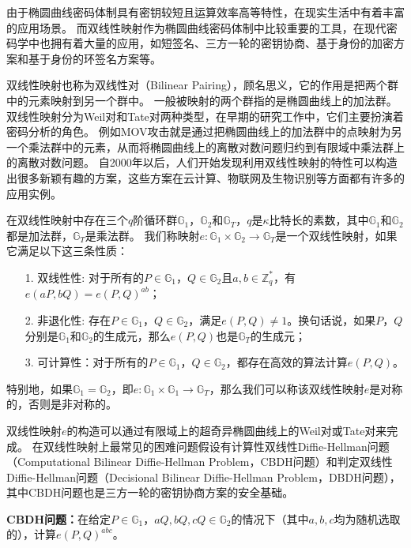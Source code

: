 由于椭圆曲线密码体制具有密钥较短且运算效率高等特性，在现实生活中有着丰富的应用场景。
而双线性映射作为椭圆曲线密码体制中比较重要的工具，在现代密码学中也拥有着大量的应用，如短签名、三方一轮的密钥协商、基于身份的加密方案和基于身份的环签名方案等\cite{boneh2001short,joux2000one,boneh2001identity,chow2005efficient}。

双线性映射也称为双线性对（Bilinear Pairing），顾名思义，它的作用是把两个群中的元素映射到另一个群中\cite{张方国2016从双线性对到多线性映射}。
一般被映射的两个群指的是椭圆曲线上的加法群。
双线性映射分为Weil对和Tate对两种类型，在早期的研究工作中，它们主要扮演着密码分析的角色。
例如MOV攻击就是通过把椭圆曲线上的加法群中的点映射为另一个乘法群中的元素，从而将椭圆曲线上的离散对数问题归约到有限域中乘法群上的离散对数问题。
自2000年以后，人们开始发现利用双线性映射的特性可以构造出很多新颖有趣的方案，这些方案在云计算、物联网及生物识别等方面都有许多的应用实例\cite{张方国2016从双线性对到多线性映射}。

在双线性映射中存在三个$q$阶循环群$\mathbb{G}_1$，$\mathbb{G}_2$和$\mathbb{G}_T$，$q$是$\kappa$比特长的素数，其中$\mathbb{G}_1$和$\mathbb{G}_2$都是加法群，$\mathbb{G}_T$是乘法群。
我们称映射$e:\mathbb{G}_1\times\mathbb{G}_2\rightarrow \mathbb{G}_T$是一个双线性映射，如果它满足以下这三条性质：
\begin{itemize}
  \item[1.] 双线性性: 对于所有的$P\in \mathbb{G}_1$，$Q\in \mathbb{G}_2$且$a,b\in\mathbb{Z}_q^*$，有$e(aP,bQ)=e(P,Q)^{ab}$；
  \item[2.] 非退化性: 存在$P\in \mathbb{G}_1$，$Q\in \mathbb{G}_2$，满足$e(P,Q)\neq1$。换句话说，如果$P$，$Q$分别是$\mathbb{G}_1$和$\mathbb{G}_2$的生成元，那么$e(P,Q)$也是$\mathbb{G}_T$的生成元；
  \item[3.] 可计算性：对于所有的$P\in\mathbb{G}_1$，$Q\in\mathbb{G}_2$，都存在高效的算法计算$e(P,Q)$。  
\end{itemize}
特别地，如果$\mathbb{G}_1=\mathbb{G}_2$，即$e:\mathbb{G}_1\times \mathbb{G}_1\rightarrow \mathbb{G}_T$，那么我们可以称该双线性映射$e$是对称的，否则是非对称的。

双线性映射$e$的构造可以通过有限域上的超奇异椭圆曲线上的Weil对或Tate对来完成。
在双线性映射上最常见的困难问题假设有计算性双线性Diffie-Hellman问题（Computational Bilinear Diffie-Hellman Problem，CBDH问题）和判定双线性Diffie-Hellman问题（Decisional Bilinear Diffie-Hellman Problem，DBDH问题），其中CBDH问题也是三方一轮的密钥协商方案的安全基础\cite{joux2000one}。

\textbf{CBDH问题：}在给定$P\in\mathbb{G}_1$，$aQ,bQ,cQ\in\mathbb{G}_2$的情况下（其中$a,b,c$均为随机选取的），计算$e(P,Q)^{abc}$。

